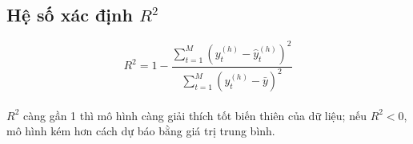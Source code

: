 \subsection{Hệ số xác định $R^2$}

\begin{equation}
  R^2 = 1 - \frac{\sum_{t=1}^{M}(y_t^{(h)} - \hat{y}_t^{(h)})^2}{\sum_{t=1}^{M}(y_t^{(h)} - \bar{y})^2}
\end{equation}
\\
$R^2$ càng gần 1 thì mô hình càng giải thích tốt biến thiên của dữ liệu; nếu $R^2 < 0$, mô hình kém hơn cách dự báo bằng giá trị trung bình.

